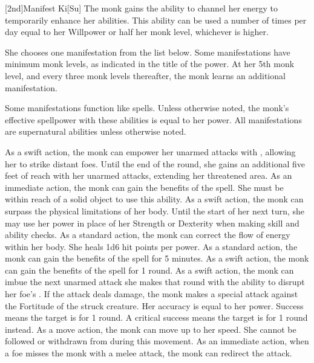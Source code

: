 [2nd]{Manifest Ki}[Su]
The monk gains the ability to channel her \ki energy to temporarily enhance her abilities.
This ability can be used a number of times per day equal to her Willpower or half her monk level, whichever is higher.

She chooses one \ki manifestation from the list below.
Some \ki manifestations have minimum monk levels, as indicated in the title of the power.
At her 5th monk level, and every three monk levels thereafter, the monk learns an additional \ki manifestation.

Some \ki manifestations function like spells.
Unless otherwise noted, the monk's effective spellpower with these abilities is equal to her \ki power.
All \ki manifestations are supernatural abilities unless otherwise noted.

As a swift action, the monk can empower her unarmed attacks with \ki, allowing her to strike distant foes.
Until the end of the round, she gains an additional five feet of reach with her unarmed attacks, extending her threatened area.
As an immediate action, the monk can gain the benefits of the  spell.
She must be within reach of a solid object to use this ability.
As a swift action, the monk can surpass the physical limitations of her body.
Until the start of her next turn, she may use her \ki power in place of her Strength or Dexterity when making skill and ability checks.
As a standard action, the monk can correct the flow of energy within her body.
She heals 1d6 hit points per \ki power.
As a standard action, the monk can gain the benefits of the  spell for 5 minutes.
As a swift action, the monk can gain the benefits of the  spell for 1 round.
As a swift action, the monk can imbue the next unarmed attack she makes that round with the ability to disrupt her foe's \ki.
If the attack deals damage, the monk makes a special attack against the Fortitude of the struck creature.
Her accuracy is equal to her \ki power.
Success means the target is \staggered for 1 round.
A critical success means the target is \stunned for 1 round instead.
\norepeatnotes
{}
As a move action, the monk can move up to her speed.
She cannot be followed or withdrawn from during this movement.
As an immediate action, when a foe misses the monk with a melee attack, the monk can redirect the attack.
